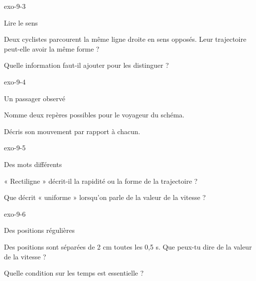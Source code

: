 \documentclass[12pt,twoside,openany]{book}
\begin{document}
\begin{blocLivre}{exo-9-3}
\begin{exercice}[1]{Lire le sens}
\begin{questions}
\item Deux cyclistes parcourent la même ligne droite en sens opposés. Leur trajectoire peut-elle avoir la même forme ?
\item Quelle information faut-il ajouter pour les distinguer ?
\end{questions}
\end{exercice}\end{blocLivre}
\begin{blocLivre}{exo-9-4}
\begin{exercice}[1]{Un passager observé}
\begin{questions}
\item Nomme deux repères possibles pour le voyageur du schéma.
\item Décris son mouvement par rapport à chacun.
\end{questions}
\end{exercice}\end{blocLivre}
\begin{blocLivre}{exo-9-5}
\begin{exercice}[1]{Des mots différents}
\begin{questions}
\item « Rectiligne » décrit-il la rapidité ou la forme de la trajectoire ?
\item Que décrit « uniforme » lorsqu’on parle de la valeur de la vitesse ?
\end{questions}
\end{exercice}\end{blocLivre}
\begin{blocLivre}{exo-9-6}
\begin{exercice}[2]{Des positions régulières}
\begin{questions}
\item Des positions sont séparées de 2 cm toutes les 0,5 s. Que peux-tu dire de la valeur de la vitesse ?
\item Quelle condition sur les temps est essentielle ?
\end{questions}
\end{exercice}\end{blocLivre}
\end{document}

